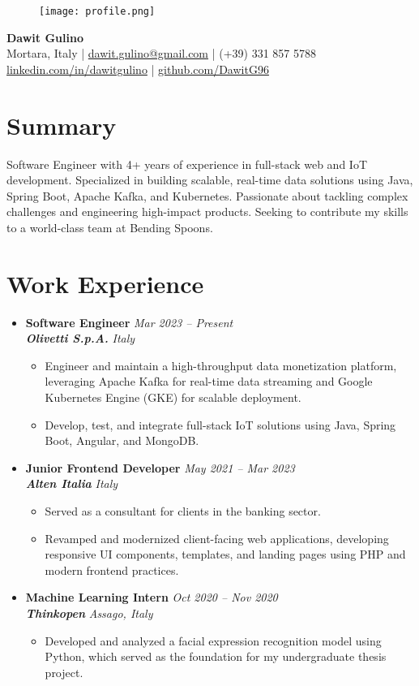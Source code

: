 \documentclass[a4paper,10pt]{article}
\newcommand{\contactinfo}[5]{
    \begin{center}
        {\Huge\bfseries\color{primarycolor} #1}\\[4pt]
        \large
        \faMapMarker\hspace{1pt} #2 \hspace{6pt} | \hspace{6pt}
        \faEnvelope\hspace{2pt} \href{mailto:#3}{#3} \hspace{6pt} | \hspace{6pt}
        \faPhone\hspace{2pt} #4 \\[4pt]
        \faLinkedin\hspace{2pt} \href{https://www.linkedin.com/in/#5}{linkedin.com/in/#5} \hspace{6pt} | \hspace{6pt}
        \faGithub\hspace{2pt} \href{https://github.com/DawitG96}{github.com/DawitG96}
    \end{center}
}
\newenvironment{entrylist}{
    \begin{itemize}[leftmargin=*, label={}, noitemsep, topsep=0pt]
}{
    \end{itemize}
}
\newcommand{\entry}[4]{
    \item
    \textbf{#1} \hfill \textit{#2} \\
    \textbf{\textit{#3}} \hfill \textit{#4}
}
\begin{document}
\begin{figure}[h]
\centering
\texttt{[image: profile.png]}
\end{figure}
\vspace{-6ex}
\contactinfo{Dawit Gulino}{Mortara, Italy}{dawit.gulino@gmail.com}{(+39) 331 857 5788}{dawitgulino}

\section*{Summary}
Software Engineer with 4+ years of experience in full-stack web and IoT development. Specialized in building scalable, real-time data solutions using Java, Spring Boot, Apache Kafka, and Kubernetes. Passionate about tackling complex challenges and engineering high-impact products. Seeking to contribute my skills to a world-class team at Bending Spoons.

\section*{Work Experience}
\begin{entrylist}
    \entry{Software Engineer}{Mar 2023 -- Present}{Olivetti S.p.A.}{Italy}
    \begin{itemize}[leftmargin=1.5em, noitemsep, topsep=0.2ex]
        \item Engineer and maintain a high-throughput data monetization platform, leveraging Apache Kafka for real-time data streaming and Google Kubernetes Engine (GKE) for scalable deployment.
        \item Develop, test, and integrate full-stack IoT solutions using Java, Spring Boot, Angular, and MongoDB.
    \end{itemize}

    \entry{Junior Frontend Developer}{May 2021 -- Mar 2023}{Alten Italia}{Italy}
    \begin{itemize}[leftmargin=1.5em, noitemsep, topsep=0.2ex]
        \item Served as a consultant for clients in the banking sector.
        \item Revamped and modernized client-facing web applications, developing responsive UI components, templates, and landing pages using PHP and modern frontend practices.
    \end{itemize}

    \entry{Machine Learning Intern}{Oct 2020 -- Nov 2020}{Thinkopen}{Assago, Italy}
    \begin{itemize}[leftmargin=1.5em, noitemsep, topsep=0.2ex]
        \item Developed and analyzed a facial expression recognition model using Python, which served as the foundation for my undergraduate thesis project.
    \end{itemize}
\end{entrylist}
\end{document}
